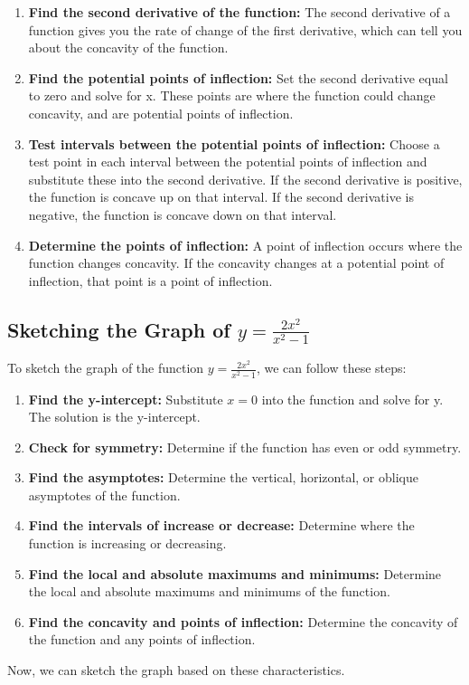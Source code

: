 \documentclass{article}
\begin{document}
\begin{enumerate}
    \item \textbf{Find the second derivative of the function:} The second derivative of a function gives you the rate of change of the first derivative, which can tell you about the concavity of the function.
    \item \textbf{Find the potential points of inflection:} Set the second derivative equal to zero and solve for x. These points are where the function could change concavity, and are potential points of inflection.
    \item \textbf{Test intervals between the potential points of inflection:} Choose a test point in each interval between the potential points of inflection and substitute these into the second derivative. If the second derivative is positive, the function is concave up on that interval. If the second derivative is negative, the function is concave down on that interval.
    \item \textbf{Determine the points of inflection:} A point of inflection occurs where the function changes concavity. If the concavity changes at a potential point of inflection, that point is a point of inflection.
\end{enumerate}

\subsection{Sketching the Graph of $y = \frac{2x^2}{x^2 - 1}$}

To sketch the graph of the function $y = \frac{2x^2}{x^2 - 1}$, we can follow these steps:

\begin{enumerate}
    \item \textbf{Find the y-intercept:} Substitute $x = 0$ into the function and solve for y. The solution is the y-intercept.
    \item \textbf{Check for symmetry:} Determine if the function has even or odd symmetry.
    \item \textbf{Find the asymptotes:} Determine the vertical, horizontal, or oblique asymptotes of the function.
    \item \textbf{Find the intervals of increase or decrease:} Determine where the function is increasing or decreasing.
    \item \textbf{Find the local and absolute maximums and minimums:} Determine the local and absolute maximums and minimums of the function.
    \item \textbf{Find the concavity and points of inflection:} Determine the concavity of the function and any points of inflection.
\end{enumerate}
\vspace{6cm}
Now, we can sketch the graph based on these characteristics.
\end{document}

